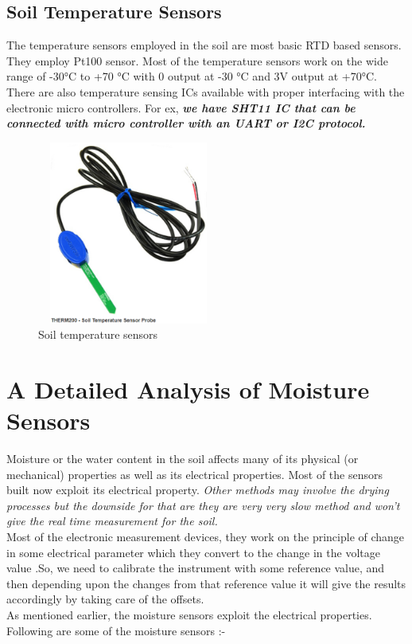 \documentclass[11pt]{article}
\begin{document}
\subsection{Soil Temperature Sensors}
The temperature sensors employed in the soil are most basic RTD based sensors. They employ Pt100 sensor. Most of the temperature sensors work on the wide range of -30°C to +70 °C with 0 output at -30 °C and 3V output at +70°C. There are also temperature sensing ICs available with proper interfacing with the electronic micro controllers. For ex,\textbf{ \textit{we have SHT11 IC that can be connected with micro controller with an UART or I2C protocol.  }}
\begin{figure}[h]
  \centering
    \vspace*{0 cm}
  \includegraphics[height=60mm,width=60mm]{ppp.PNG}
    \caption{Soil temperature sensors}
  \label{fig:Soil Moisture Sensor}
\end{figure}
\pagebreak
\section{A Detailed Analysis of Moisture Sensors}
Moisture or the water content in the soil affects many of its physical (or mechanical) properties as well as its electrical properties. Most of the sensors built now exploit its electrical property. \textit{Other methods may involve the drying processes but the downside for that are they are very very slow method and won't give the real time measurement for the soil.\\}
Most of the electronic measurement devices, they work on the principle of change in some electrical parameter which they convert to the change in the voltage value .So, we need to calibrate the instrument with some reference value, and then depending upon the changes from that reference value it will give the results accordingly by taking care of the offsets.
\\
As mentioned earlier, the moisture sensors exploit the electrical properties. Following are some of the moisture sensors :- \\
\end{document}
